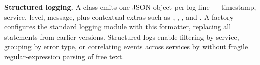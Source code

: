 \textbf{Structured logging.} A  class emits one JSON object per log line --- timestamp, service, level, message, plus contextual extras such as , , , and . A  factory configures the standard logging module with this formatter, replacing all  statements from earlier versions. Structured logs enable filtering by service, grouping by error type, or correlating events across services by  without fragile regular-expression parsing of free text.
